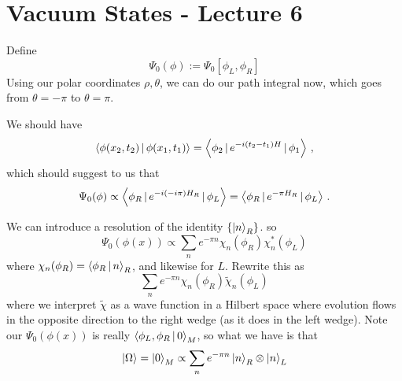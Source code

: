 \documentclass{article}
\begin{document}
\section{Vacuum States - Lecture 6}
Define 
\[
\Psi_0(\phi) := \Psi_0[\phi_L, \phi_R]
\]
Using our polar coordinates $\rho, \theta$, we can do our path integral now, which goes from $\theta=-\pi$ to $\theta=\pi$. 
\begin{remark}
	We should have 
	\[
	\left\langle \phi(x_2, t_2) \, | \, \phi(x_1, t_1) \right\rangle = \left\langle \phi_2 \, | \, e^{-i(t_2-t_1)H} \, | \, \phi_1 \right\rangle \, , 
	\]
	which should suggest to us that 
	\[
	\Psi_0(\phi) \propto \left\langle \phi_R \, | \, e^{-i(-i\pi)H_R} \, | \, \phi_L  \right\rangle = \left\langle \phi_R \, | \, e^{-\pi H_R} \, | \, \phi_L \right\rangle \, . 
	\]
\end{remark}
We can introduce a resolution of the identity $\left\{ \ket{n}_R \right\}$. so 
\[
\Psi_0(\phi(x)) \propto \sum_n e^{-\pi n} \chi_n (\phi_R) \chi_n^\ast (\phi_L)
\]
where $\chi_n(\phi_R) = \left\langle \phi_R \, | \, n \right\rangle_R$, and likewise for $L$. Rewrite this as 
\[
\sum_n e^{-\pi n } \chi_n(\phi_R) \tilde{\chi}_n(\phi_L)
\]
where we interpret $\tilde{\chi}$ as a wave function in a Hilbert space where evolution flows in the opposite direction to the right wedge (as it does in the left wedge). Note our $\Psi_0(\phi(x))$ is really $\left\langle \phi_L, \phi_R \, | \, 0 \right\rangle_M$, so what we have is that 
\[
\ket{\Omega} = \ket{0}_M \propto \sum_n e^{-\pi n} \ket{n}_R \otimes \ket{n}_L
\]
\end{document}
